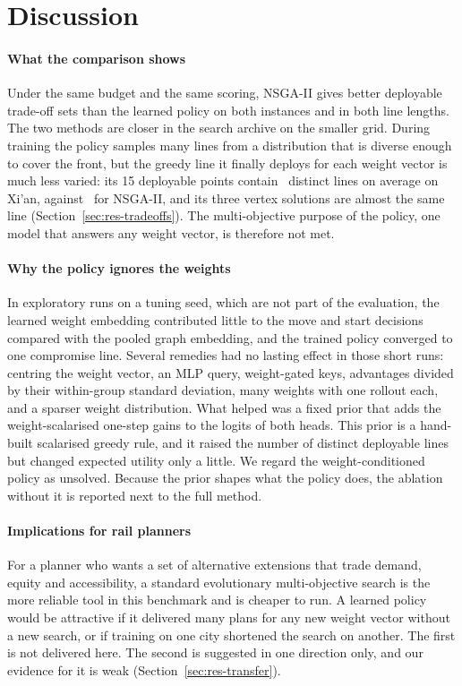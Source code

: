 \section{Discussion}\label{sec:discussion}

\paragraph{What the comparison shows} Under the same budget and the same scoring, NSGA-II gives better deployable trade-off sets than the learned policy on both instances and in both line lengths. The two methods are closer in the search archive on the smaller grid. During training the policy samples many lines from a distribution that is diverse enough to cover the front, but the greedy line it finally deploys for each weight vector is much less varied: its 15 deployable points contain \XianRLLines\ distinct lines on average on Xi'an, against \XianNSGALines\ for NSGA-II, and its three vertex solutions are almost the same line (Section~\ref{sec:res-tradeoffs}). The multi-objective purpose of the policy, one model that answers any weight vector, is therefore not met.

\paragraph{Why the policy ignores the weights} In exploratory runs on a tuning seed, which are not part of the evaluation, the learned weight embedding contributed little to the move and start decisions compared with the pooled graph embedding, and the trained policy converged to one compromise line. Several remedies had no lasting effect in those short runs: centring the weight vector, an MLP query, weight-gated keys, advantages divided by their within-group standard deviation, many weights with one rollout each, and a sparser weight distribution. What helped was a fixed prior that adds the weight-scalarised one-step gains to the logits of both heads. This prior is a hand-built scalarised greedy rule, and it raised the number of distinct deployable lines but changed expected utility only a little. We regard the weight-conditioned policy as unsolved. Because the prior shapes what the policy does, the ablation without it is reported next to the full method.

\paragraph{Implications for rail planners} For a planner who wants a set of alternative extensions that trade demand, equity and accessibility, a standard evolutionary multi-objective search is the more reliable tool in this benchmark and is cheaper to run. A learned policy would be attractive if it delivered many plans for any new weight vector without a new search, or if training on one city shortened the search on another. The first is not delivered here. The second is suggested in one direction only, and our evidence for it is weak (Section~\ref{sec:res-transfer}).


